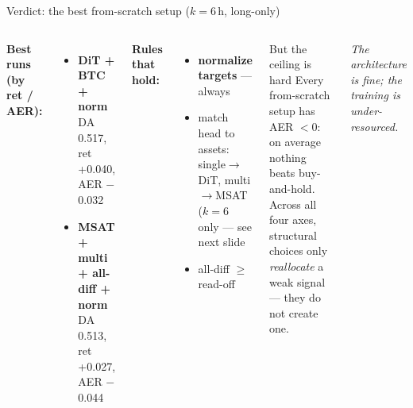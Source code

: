 \documentclass[10pt,aspectratio=169]{beamer}
\newcommand{\gd}[1]{\textbf{\textcolor{good}{#1}}}
\newcommand{\bd}[1]{\textcolor{bad}{#1}}
\begin{document}
\begin{frame}{Verdict: the best from-scratch setup \hfill\normalfont\small($k{=}6$\,h, long-only)}
\footnotesize
\begin{columns}[T]
\textbf{Best runs (by ret / AER):}
\begin{itemize}\itemsep2pt
\item \gd{DiT + BTC + norm} \\ DA 0.517, ret +0.040, AER $-$0.032
\item \gd{MSAT + multi + all-diff + norm} \\ DA 0.513, ret +0.027, AER $-$0.044
\end{itemize}
\vspace{0.5em}
\textbf{Rules that hold:}
\begin{itemize}\itemsep2pt
\item[(iv)] \gd{normalize targets} --- always
\item[(i,ii)] match head to assets: \\ single$\to$DiT, multi$\to$MSAT \\
 {\scriptsize\bd{($k{=}6$ only --- see next slide}}
\item[(iii)] all-diff $\geq$ read-off
\end{itemize}

\begin{block}{But the ceiling is hard}
Every from-scratch setup has \bd{AER $<0$}: on average \bd{nothing beats buy-and-hold}.\\[0.4em]
Across all four axes, structural choices only \emph{reallocate} a weak signal --- they do not
create one.
\end{block}
\vspace{0.3em}
\centering
\textit{The architecture is fine; the training is under-resourced.}
\end{columns}
\end{frame}
\end{document}
